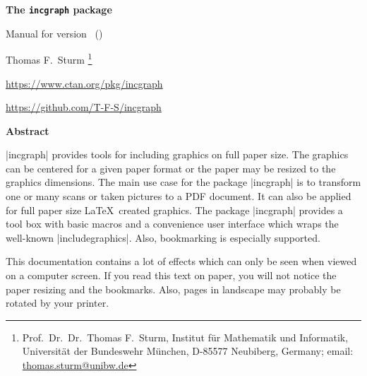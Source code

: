 \documentclass[a4paper,11pt]{ltxdoc}
\begin{document}
\begin{center}
\vspace*{5mm}
\begin{tcolorbox}[enhanced,
  center upper,width=10cm,boxrule=0.4pt,
  colback=white,colframe=black!50!yellow,drop fuzzy midday shadow=black!50!yellow]
{\bfseries\LARGE The \texttt{incgraph} package\par}\medskip
{\large Manual for version \version\ (\datum)\par}
\end{tcolorbox}\bigskip
{\large Thomas F.~Sturm%
  \footnote{Prof.~Dr.~Dr.~Thomas F.~Sturm, Institut f\"{u}r Mathematik und Informatik,
    Universit\"{a}t der Bundeswehr M\"{u}nchen, D-85577 Neubiberg, Germany;
     email: \href{mailto:thomas.sturm@unibw.de}{thomas.sturm@unibw.de}}\par\medskip
\normalsize\url{https://www.ctan.org/pkg/incgraph}\par
\url{https://github.com/T-F-S/incgraph}
}
\end{center}
\bigskip
\begin{absquote}
  \begin{center}\bfseries Abstract\end{center}
  |incgraph| provides tools for including graphics on full paper size.
  The graphics can be centered for a given paper format or the paper may be
  resized to the graphics dimensions.
  The main use case for the package |incgraph| is to transform one or many scans
  or taken pictures to a PDF document. It can also be applied for full paper size
  \LaTeX\ created graphics.
  The package |incgraph| provides a tool box with basic macros and a
  convenience user interface which wraps the well-known |includegraphics|.
  Also, bookmarking is especially supported.
\end{absquote}

\enlargethispage*{1cm}
\tableofcontents

\begin{inctext}[paper=graphics]
  \begin{tcolorbox}[title={Caveat\hfill --- Page \thepage\ ---},
    colframe=red!65!black,colback=red!10!white,fonttitle=\Large\bfseries,
    fontupper=\large,arc=0mm,outer arc=0mm]
    This documentation contains a lot of effects which can only be seen
    when viewed on a computer screen. If you read this text on paper, you
    will not notice the paper resizing and the bookmarks. Also, pages in landscape may probably
    be rotated by your printer.
  \end{tcolorbox}
\end{inctext}
\end{document}
